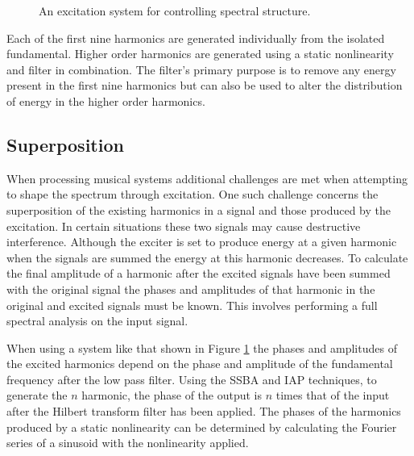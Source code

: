 \begin{figure}[h!]
			\caption{An excitation system for controlling spectral structure.}
			\label{fig:SpectralShapingSystem}
		\end{figure}

		Each of the first nine harmonics are generated individually from the isolated fundamental. Higher order
		harmonics are generated using a static nonlinearity and filter in combination. The filter's primary purpose
		is to remove any energy present in the first nine harmonics but can also be used to alter the distribution
		of energy in the higher order harmonics.

	\subsection{Superposition}
	\label{sec:FeatureControl-Systems-Superposition}
		When processing musical systems additional challenges are met when attempting to shape the spectrum through
		excitation. One such challenge concerns the superposition of the existing harmonics in a signal and those
		produced by the excitation. In certain situations these two signals may cause destructive interference.
		Although the exciter is set to produce energy at a given harmonic when the signals are summed the energy at
		this harmonic decreases. To calculate the final amplitude of a harmonic after the excited signals have been
		summed with the original signal the phases and amplitudes of that harmonic in the original and excited
		signals must be known. This involves performing a full spectral analysis on the input signal. 

		When using a system like that shown in Figure \ref{fig:SpectralShapingSystem} the phases and amplitudes of
		the excited harmonics depend on the phase and amplitude of the fundamental frequency after the low pass
		filter. Using the SSBA and IAP techniques, to generate the $n$ harmonic, the phase of the output
		is $n$ times that of the input after the Hilbert transform filter has been applied. The phases of the
		harmonics produced by a static nonlinearity can be determined by calculating the Fourier series of a
		sinusoid with the nonlinearity applied.

